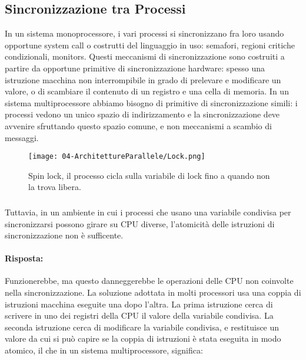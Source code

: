 \subsection{Sincronizzazione tra Processi}

In un sistema monoprocessore, i vari processi si sincronizzano fra
loro usando opportune system call o costrutti del linguaggio in uso:
semafori, regioni critiche condizionali, monitors. Questi meccanismi di sincronizzazione sono costruiti a partire da
opportune primitive di sincronizzazione hardware: spesso una
istruzione macchina non interrompibile in grado di prelevare e
modificare un valore, o di scambiare il contenuto di un registro e
una cella di memoria. In un sistema multiprocessore abbiamo bisogno di primitive di
sincronizzazione simili: i processi vedono un unico spazio di
indirizzamento e la sincronizzazione deve avvenire sfruttando
questo spazio comune, e non meccanismi a scambio di messaggi.

\begin{figure}[h]
    \centering
    \texttt{[image: 04-ArchitettureParallele/Lock.png]}
    \caption{Spin lock, il processo cicla sulla variabile di lock fino a quando non la trova libera.}
\end{figure}


\subsubsection{}

Tuttavia, in un ambiente in cui i processi che usano una variabile
condivisa per sincronizzarsi possono girare su CPU diverse,
l’atomicità delle istruzioni di sincronizzazione non è sufficente. 


\paragraph{Risposta:} Funzionerebbe, ma questo danneggerebbe le operazioni delle CPU
non coinvolte nella sincronizzazione. La soluzione adottata in molti processori usa una coppia di
istruzioni macchina eseguite una dopo l’altra. La prima istruzione cerca di scrivere in uno dei registri della CPU
il valore della variabile condivisa. La seconda istruzione cerca di modificare la variabile condivisa, e
restituisce un valore da cui si può capire
se la coppia di istruzioni è stata eseguita in modo atomico,
il che in un sistema multiprocessore, significa: 


